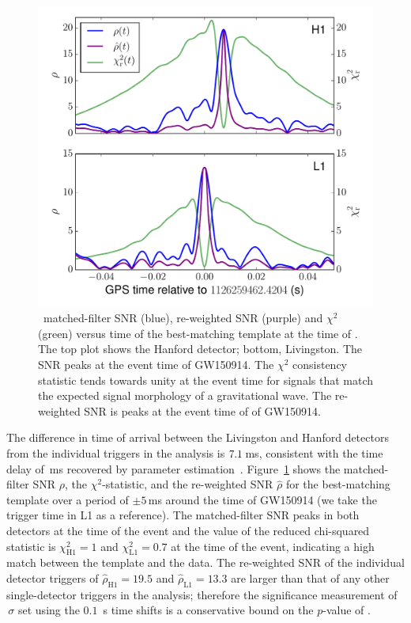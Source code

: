 \begin{figure}[t]
\includegraphics[width=\textwidth]{figs/chapter2/combined_single.pdf}
\caption{\label{fig:pycbc_gstlal_snr_chisq_vs_time}
\pycbc{}\ matched-filter SNR (blue), re-weighted SNR (purple) and $\chi^2$
(green) versus time of the best-matching template at the time of \TheEvent.
The top plot shows the Hanford detector; bottom, Livingston. The SNR peaks
at the event time of GW150914. The $\chi^2$ consistency statistic
tends towards unity at the event time for signals that match the
expected signal morphology of a gravitational wave. The re-weighted SNR
is peaks at the event time of of GW150914.
}
\end{figure}

The difference in time of arrival between the Livingston and Hanford detectors
from the individual triggers in the \pycbc{} analysis is
$7.1\,$ms, consistent with the time delay of
\TIMEDELAYCOMPACT\,ms recovered by parameter
estimation~\cite{GW150914-PARAMESTIM}.
Figure~\ref{fig:pycbc_gstlal_snr_chisq_vs_time} shows the
matched-filter SNR $\rho$, the $\chi^2$-statistic, and the re-weighted SNR
$\hat\rho$ for the best-matching template over a period of $\pm5$\,ms around
the time of GW150914 (we take the \pycbc{} trigger time in L1 as a reference).
The matched-filter SNR peaks in both detectors at the time of the event and
the value of the reduced chi-squared statistic is $\chi^2_\mathrm{H1} = 1$ and
$\chi^2_\mathrm{L1} = 0.7$ at the time of the event, indicating a high
match between the template and the data. The re-weighted SNR of the individual
detector triggers of $\hat{\rho}_\mathrm{H1} = 19.5$ and
$\hat{\rho}_\mathrm{L1} = 13.3$ are larger than that of any other
single-detector triggers in the analysis; therefore the significance
measurement of \CBCEVENTSIGMA $\,\sigma$ set using the $0.1$~s time shifts is
a conservative bound on the $p$-value of \TheEvent.

